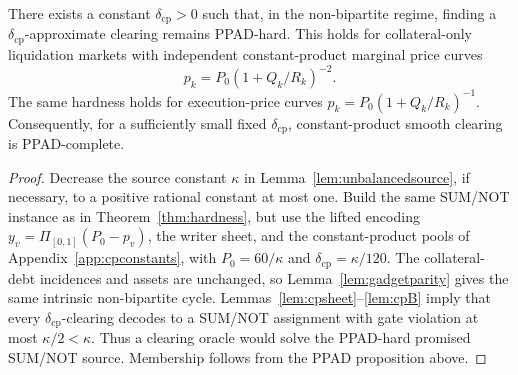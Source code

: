 \documentclass{llncs}
\newcommand{\clip}{\Pi}
\begin{document}
\begin{theorem}
\label{thm:cphardness}
There exists a constant \(\delta_{\mathrm{cp}}>0\) such that, in the non-bipartite regime, finding a \(\delta_{\mathrm{cp}}\)-approximate clearing remains PPAD-hard. This holds for collateral-only liquidation markets with independent constant-product marginal price curves
\[
        p_k=P_0(1+Q_k/R_k)^{-2}.
\]
The same hardness holds for execution-price curves \(p_k=P_0(1+Q_k/R_k)^{-1}\). Consequently, for a sufficiently small fixed \(\delta_{\mathrm{cp}}\), constant-product smooth clearing is PPAD-complete.
\end{theorem}
\begin{proof}
Decrease the source constant \(\kappa\) in Lemma~\ref{lem:unbalancedsource}, if necessary, to a positive rational constant at most one. Build the same SUM/NOT instance as in Theorem~\ref{thm:hardness}, but use the lifted encoding \(y_v=\clip_{[0,1]}(P_0-p_v)\), the writer sheet, and the constant-product pools of Appendix~\ref{app:cpconstants}, with \(P_0=60/\kappa\) and \(\delta_{\mathrm{cp}}=\kappa/120\). The collateral-debt incidences and assets are unchanged, so Lemma~\ref{lem:gadgetparity} gives the same intrinsic non-bipartite cycle. Lemmas~\ref{lem:cpsheet}--\ref{lem:cpB} imply that every \(\delta_{\mathrm{cp}}\)-clearing decodes to a SUM/NOT assignment with gate violation at most \(\kappa/2<\kappa\). Thus a clearing oracle would solve the PPAD-hard promised SUM/NOT source. Membership follows from the PPAD proposition above.
\end{proof}
\end{document}
